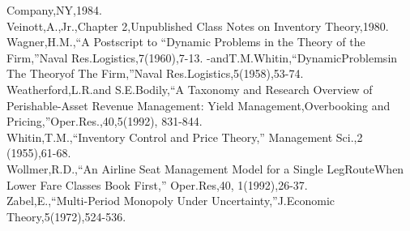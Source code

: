 Company,NY,1984.\\
Veinott,A.,Jr.,Chapter 2,Unpublished Class Notes on Inventory
Theory,1980.\\
Wagner,H.M.,``A Postscript to ``Dynamic Problems in the Theory of the
Firm,''Naval Res.Logistics,7(1960),7-13.
-andT.M.Whitin,``DynamicProblemsin The Theoryof The Firm,''Naval
Res.Logistics,5(1958),53-74.\\
Weatherford,L.R.and S.E.Bodily,``A Taxonomy and Research Overview of
Perishable-Asset Revenue Management: Yield Management,Overbooking and
Pricing,''Oper.Res.,40,5(1992), 831-844.\\
Whitin,T.M.,``Inventory Control and Price Theory,'' Management Sci.,2
(1955),61-68.\\
Wollmer,R.D.,``An Airline Seat Management Model for a Single
LegRouteWhen Lower Fare Classes Book First,'' Oper.Res,40,
1(1992),26-37.\\
Zabel,E.,``Multi-Period Monopoly Under Uncertainty,''J.Economic
Theory,5(1972),524-536.


